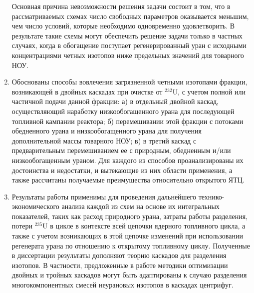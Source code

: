 \begin{enumerate}[label=\Roman*.]
Основная причина невозможности решения задачи состоит в том, что в рассматриваемых схемах число свободных параметров оказывается меньшим, чем число условий, которые необходимо одновременно удовлетворить. В результате такие схемы могут обеспечить решение задачи только в частных случаях, когда в обогащение поступает регенерированный уран с исходными концентрациями четных изотопов ниже предельных значений для товарного НОУ.

\item Обоснованы способы вовлечения загрязненной четными изотопами фракции, возникающей в двойных каскадах при очистке от $^{232}$U, с учетом полной или частичной подачи данной фракции: а) в отдельный двойной каскад, осуществляющий наработку низкообогащенного урана для последующей топливной кампании реактора; б) перемешивании этой фракции с потоками обедненного урана и низкообогащенного урана для получения дополнительной массы товарного НОУ; в) в третий каскад с предварительным перемешиванием ее с природным, обедненным и/или низкообогащенным ураном. Для каждого из способов проанализированы их достоинства и недостатки, и вытекающие из них области применения, а также рассчитаны получаемые преимущества относительно открытого ЯТЦ.
 
\item Результаты работы применимы для проведения дальнейшего технико-экономического анализа каждой из схем на основе их интегральных показателей, таких как расход природного урана, затраты работы разделения, потери $^{235}$U в цикле в контексте всей цепочки ядерного топливного цикла, а также с учетом возникающих в этой цепочке изменений при использовании регенерата урана по отношению к открытому топливному циклу. Полученные в диссертации результаты дополняют теорию каскадов для разделения изотопов. В частности, предложенные в работе методики оптимизации двойных и тройных каскадов могут быть адаптированы к случаю разделения многокомпонентных смесей неурановых изотопов в каскадах центрифуг.

\end{enumerate}
